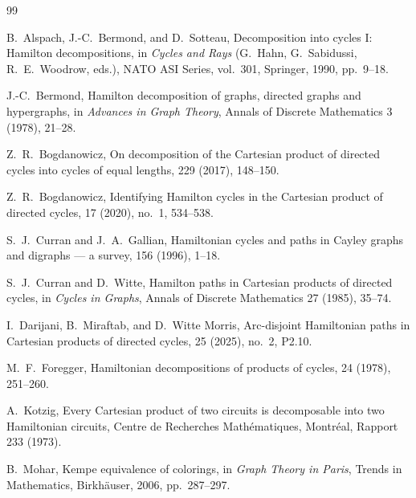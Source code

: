 \documentclass[11pt]{article}
\begin{document}
\begin{thebibliography}{99}

B.~Alspach, J.-C.~Bermond, and D.~Sotteau,
\newblock Decomposition into cycles I: Hamilton decompositions,
\newblock in {\em Cycles and Rays} (G.~Hahn, G.~Sabidussi, R.~E.~Woodrow, eds.),
NATO ASI Series, vol.~301, Springer, 1990, pp.~9--18.

J.-C.~Bermond,
\newblock Hamilton decomposition of graphs, directed graphs and hypergraphs,
\newblock in {\em Advances in Graph Theory}, Annals of Discrete Mathematics 3 (1978), 21--28.

Z.~R.~Bogdanowicz,
\newblock On decomposition of the Cartesian product of directed cycles into cycles of equal lengths,
 229 (2017), 148--150.

Z.~R.~Bogdanowicz,
\newblock Identifying Hamilton cycles in the Cartesian product of directed cycles,
 17 (2020), no.~1, 534--538.

S.~J.~Curran and J.~A.~Gallian,
\newblock Hamiltonian cycles and paths in Cayley graphs and digraphs --- a survey,
 156 (1996), 1--18.

S.~J.~Curran and D.~Witte,
\newblock Hamilton paths in Cartesian products of directed cycles,
\newblock in {\em Cycles in Graphs}, Annals of Discrete Mathematics 27 (1985), 35--74.

I.~Darijani, B.~Miraftab, and D.~Witte Morris,
\newblock Arc-disjoint Hamiltonian paths in Cartesian products of directed cycles,
 25 (2025), no.~2, P2.10.

M.~F.~Foregger,
\newblock Hamiltonian decompositions of products of cycles,
 24 (1978), 251--260.

A.~Kotzig,
\newblock Every Cartesian product of two circuits is decomposable into two Hamiltonian circuits,
\newblock Centre de Recherches Math\'ematiques, Montr\'eal, Rapport 233 (1973).

B.~Mohar,
\newblock Kempe equivalence of colorings,
\newblock in {\em Graph Theory in Paris}, Trends in Mathematics, Birkh\"auser, 2006, pp.~287--297.


\end{thebibliography}
\end{document}
